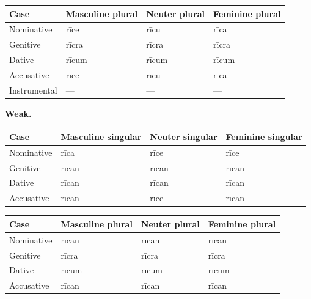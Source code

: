 \begin{tabular}{@{}>{\raggedright\arraybackslash}p{22.0mm}>{\raggedright\arraybackslash}p{31.188mm}>{\raggedright\arraybackslash}p{31.188mm}>{\raggedright\arraybackslash}p{31.188mm}@{}}
\toprule
\textbf{Case} & \textbf{Masculine plural} & \textbf{Neuter plural} & \textbf{Feminine plural} \\
\midrule
Nominative & rīce & rīcu & rīca \\
Genitive & rīcra & rīcra & rīcra \\
Dative & rīcum & rīcum & rīcum \\
Accusative & rīce & rīcu & rīca \\
Instrumental & — & — & — \\
\bottomrule
\end{tabular}
\par\endgroup

\textbf{Weak.}

\par\begingroup
\fontsize{10.5}{13.2}\selectfont
\setlength{\LTleft}{0pt}\setlength{\LTright}{\fill}
\noindent
\begin{tabular}{@{}>{\raggedright\arraybackslash}p{22.0mm}>{\raggedright\arraybackslash}p{31.188mm}>{\raggedright\arraybackslash}p{31.188mm}>{\raggedright\arraybackslash}p{31.188mm}@{}}
\toprule
\textbf{Case} & \textbf{Masculine singular} & \textbf{Neuter singular} & \textbf{Feminine singular} \\
\midrule
Nominative & rīca & rīce & rīce \\
Genitive & rīcan & rīcan & rīcan \\
Dative & rīcan & rīcan & rīcan \\
Accusative & rīcan & rīce & rīcan \\
\bottomrule
\end{tabular}
\par\endgroup
\par\addvspace{5pt}
\par\begingroup
\fontsize{10.5}{13.2}\selectfont
\setlength{\LTleft}{0pt}\setlength{\LTright}{\fill}
\noindent
\begin{tabular}{@{}>{\raggedright\arraybackslash}p{22.0mm}>{\raggedright\arraybackslash}p{31.188mm}>{\raggedright\arraybackslash}p{31.188mm}>{\raggedright\arraybackslash}p{31.188mm}@{}}
\toprule
\textbf{Case} & \textbf{Masculine plural} & \textbf{Neuter plural} & \textbf{Feminine plural} \\
\midrule
Nominative & rīcan & rīcan & rīcan \\
Genitive & rīcra & rīcra & rīcra \\
Dative & rīcum & rīcum & rīcum \\
Accusative & rīcan & rīcan & rīcan \\
\bottomrule
\end{tabular}
\par\endgroup

